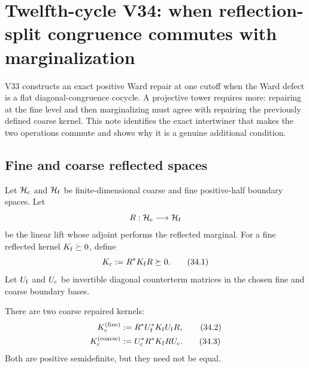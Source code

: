 \documentclass[11pt]{article}
\theoremstyle{remark}
\begin{document}

\section{Twelfth-cycle V34: when reflection-split congruence commutes
with marginalization}
\label{sec:v12v34}

V33 constructs an exact positive Ward repair at one cutoff when the
Ward defect is a flat diagonal-congruence cocycle.  A projective
tower requires more: repairing at the fine level and then
marginalizing must agree with repairing the previously defined
coarse kernel.  This note identifies the exact intertwiner that makes
the two operations commute and shows why it is a genuine additional
condition.

\subsection{Fine and coarse reflected spaces}

Let \({\cal H}_{\rm c}\) and \({\cal H}_{\rm f}\) be finite-dimensional
coarse and fine positive-half boundary spaces.  Let
\[
 R:{\cal H}_{\rm c}\longrightarrow{\cal H}_{\rm f}
\]
be the linear lift whose adjoint performs the reflected marginal.
For a fine reflected kernel \(K_{\rm f}\succeq0\), define
\begin{equation}
 K_{\rm c}:=R^*K_{\rm f}R\succeq0.                \tag{34.1}
\end{equation}
Let \(U_{\rm f}\) and \(U_{\rm c}\) be invertible diagonal
counterterm matrices in the chosen fine and coarse boundary bases.

There are two coarse repaired kernels:
\begin{align}
 K_{\rm c}^{({\rm fine})}
 &:=
 R^*U_{\rm f}^*K_{\rm f}U_{\rm f}R,              \tag{34.2}\\
 K_{\rm c}^{({\rm coarse})}
 &:=
 U_{\rm c}^*R^*K_{\rm f}RU_{\rm c}.              \tag{34.3}
\end{align}
Both are positive semidefinite, but they need not be equal.
\end{document}
